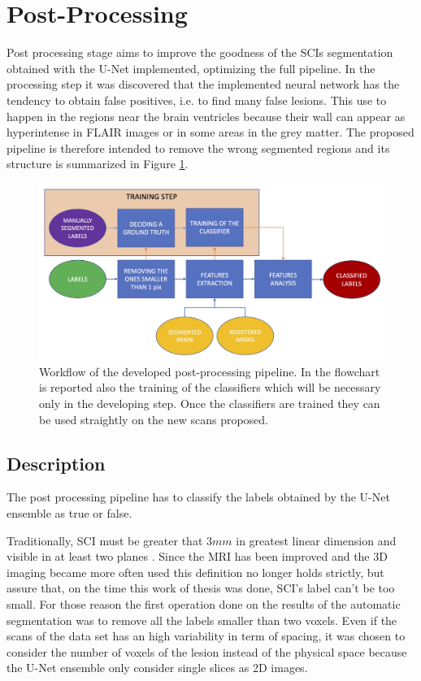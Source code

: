 \documentclass{standalone}
\begin{document}



\section{Post-Processing}

Post processing stage aims to improve the goodness of the SCIs segmentation obtained with the U-Net implemented, optimizing the full pipeline.
In the processing step it was discovered that the implemented neural network has the tendency to obtain false positives, i.e. to find many false lesions. This use to happen in the regions near the brain ventricles because their wall can appear as hyperintense in FLAIR images or in some areas in the grey matter.
The proposed pipeline is therefore intended to remove the wrong segmented regions and its structure is summarized in Figure \ref{fig:flowchart_post}.

\begin{figure}[h!]
    \centering
    \includegraphics[scale = 0.16]{img/Chap2/FLOWCHART_POST.jpg}
    \caption{Workflow of the developed post-processing pipeline. In the flowchart is reported also the training of the classifiers which will be necessary only in the developing step. Once the classifiers are trained they can be used straightly on the new scans proposed.  }
    \label{fig:flowchart_post}
\end{figure}

\subsection{Description}

The post processing pipeline has to classify the labels obtained by the U-Net ensemble as true or false.

Traditionally, SCI must be greater that $3 mm$ in greatest linear dimension \cite{ART:Debaun} and visible in at least two planes \cite{Art:Casella}. 
Since the MRI has been improved and the 3D imaging became more often used this definition no longer holds strictly, but assure that, on the time this work of thesis was done, SCI's label can't be too small.
For those reason the first operation done on the results of the automatic segmentation was to remove all the labels smaller than two voxels. Even if the scans of the data set has an high variability in term of spacing, it was chosen to consider the number of voxels of the lesion instead of the physical space because the U-Net ensemble only consider single slices as 2D images.
\end{document}
